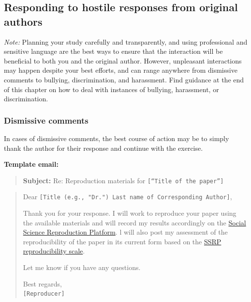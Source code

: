 \documentclass[
]{book}
\begin{document}
\hypertarget{responding-to-hostile-responses-from-original-authors}{%
\subsection{Responding to hostile responses from original authors}\label{responding-to-hostile-responses-from-original-authors}}

\emph{Note:} Planning your study carefully and transparently, and using professional and sensitive language are the best ways to ensure that the interaction will be beneficial to both you and the original author. However, unpleasant interactions may happen despite your best efforts, and can range anywhere from dismissive comments to bullying, discrimination, and harassment. Find guidance at the end of this chapter on how to deal with instances of bullying, harassment, or discrimination.

\hypertarget{dismissive-comments}{%
\subsubsection{Dismissive comments}\label{dismissive-comments}}

In cases of dismissive comments, the best course of action may be to simply thank the author for their response and continue with the exercise.

\textbf{Template email:}

\begin{quote}
\textbf{Subject:} Re: Reproduction materials for \texttt{{[}“Title\ of\ the\ paper”{]}}
\end{quote}

\begin{quote}
Dear \texttt{{[}Title\ (e.g.,\ "Dr.")\ Last\ name\ of\ Corresponding\ Author{]}},

Thank you for your response. I will work to reproduce your paper using the available materials and will record my results accordingly on the \href{https://www.socialsciencereproduction.org/}{Social Science Reproduction Platform}. l will also post my assessment of the reproducibility of the paper in its current form based on the \href{https://bitss.github.io/ACRE/assessment.html\#levels-of-computational-reproducibility-for-a-specific-output}{SSRP reproducibility scale}.

Let me know if you have any questions.

Best regards,\\
\texttt{{[}Reproducer{]}}
\end{quote}
\end{document}
